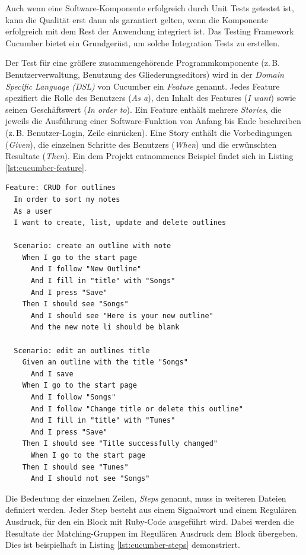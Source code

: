 Auch wenn eine Software-Komponente erfolgreich durch Unit Tests getestet ist, kann die Qualität erst dann als garantiert gelten, wenn die Komponente erfolgreich mit dem Rest der Anwendung integriert ist. Das Testing Framework Cucumber \cite{cucumber:website} bietet ein Grundgerüst, um solche Integration Tests zu erstellen.

Der Test für eine größere zusammengehörende Programmkomponente (z.\,B. Benutzerverwaltung, Benutzung des Gliederungseditors) wird in der \textit{Domain Specific Language (DSL)} von Cucumber ein \textit{Feature} genannt. Jedes Feature spezifiert die Rolle des Benutzers (\textit{As a}), den Inhalt des Features (\textit{I want}) sowie seinen Geschäftswert (\textit{In order to}). Ein Feature enthält mehrere \textit{Stories}, die jeweils die Ausführung einer Software-Funktion von Anfang bis Ende beschreiben (z.\,B. Benutzer-Login, Zeile einrücken). Eine Story enthält die Vorbedingungen (\textit{Given}), die einzelnen Schritte des Benutzers (\textit{When}) und die erwünschten Resultate (\textit{Then}). Ein dem Projekt entnommenes Beispiel findet sich in Listing \ref{lst:cucumber-feature}.

\lstset{language=ruby, style=cucumber}
\medskip
\begin{lstlisting}[caption=Ein Cucumber Feature mit zwei Szenarien,label=lst:cucumber-feature]
Feature: CRUD for outlines
  In order to sort my notes
  As a user
  I want to create, list, update and delete outlines
  
  Scenario: create an outline with note
    When I go to the start page 
      And I follow "New Outline" 
      And I fill in "title" with "Songs"
      And I press "Save"
    Then I should see "Songs"
      And I should see "Here is your new outline"
      And the new note li should be blank
      
  Scenario: edit an outlines title
    Given an outline with the title "Songs"
      And I save
    When I go to the start page
      And I follow "Songs"
      And I follow "Change title or delete this outline"
      And I fill in "title" with "Tunes"
      And I press "Save"
    Then I should see "Title successfully changed"
      When I go to the start page
    Then I should see "Tunes"
      And I should not see "Songs"
\end{lstlisting}

Die Bedeutung der einzelnen Zeilen, \textit{Steps} genannt, muss in weiteren Dateien definiert werden. Jeder Step besteht aus einem Signalwort und einem Regulären Ausdruck, für den ein Block mit Ruby-Code ausgeführt wird. Dabei werden die Resultate der Matching-Gruppen im Regulären Ausdruck dem Block übergeben. Dies ist beispielhaft in Listing \ref{lst:cucumber-steps} demonstriert.


